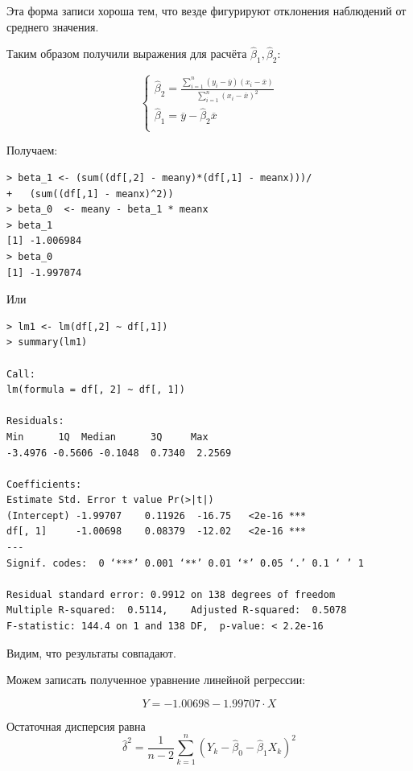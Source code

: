 \documentclass[14pt,a4paper]{scrartcl}
\begin{document}
Эта форма записи хороша тем, что везде фигурируют отклонения наблюдений от среднего значения.


Таким образом получили выражения для расчёта $\hat \beta_1,\hat \beta_2$:

\begin{equation}\label{21}
	\begin{cases} 
	 \hat\beta_2 = \frac{\sum\limits_{i=1}^{n}(y_i-\overline{y})(x_i-\overline{x})}{\sum\limits_{i=1}^{n}(x_i-\overline{x})^2}\\
	 \hat\beta_1 = \overline{y} - \hat\beta_2\overline{x}\\ 
	\end{cases}	
\end{equation}

Получаем:
\begin{verbatim}
> beta_1 <- (sum((df[,2] - meany)*(df[,1] - meanx)))/
+   (sum((df[,1] - meanx)^2))
> beta_0  <- meany - beta_1 * meanx
> beta_1
[1] -1.006984
> beta_0
[1] -1.997074
\end{verbatim}

Или
\begin{verbatim}
> lm1 <- lm(df[,2] ~ df[,1])
> summary(lm1)

Call:
lm(formula = df[, 2] ~ df[, 1])

Residuals:
Min      1Q  Median      3Q     Max 
-3.4976 -0.5606 -0.1048  0.7340  2.2569 

Coefficients:
Estimate Std. Error t value Pr(>|t|)    
(Intercept) -1.99707    0.11926  -16.75   <2e-16 ***
df[, 1]     -1.00698    0.08379  -12.02   <2e-16 ***
---
Signif. codes:  0 ‘***’ 0.001 ‘**’ 0.01 ‘*’ 0.05 ‘.’ 0.1 ‘ ’ 1

Residual standard error: 0.9912 on 138 degrees of freedom
Multiple R-squared:  0.5114,	Adjusted R-squared:  0.5078 
F-statistic: 144.4 on 1 and 138 DF,  p-value: < 2.2e-16
\end{verbatim}

Видим, что результаты совпадают.

Можем записать полученное уравнение линейной регрессии:

\begin{equation*}
	Y = -1.00698 -1.99707\cdot X
\end{equation*}


Остаточная дисперсия равна
\begin{equation*}
	\hat{\delta}^{2}=\frac{1}{n-2} \sum_{k=1}^{n}\left(Y_{k}-\hat{\beta}_{0}-\hat{\beta}_{1} X_{k}\right)^{2}
\end{equation*}
\end{document}
